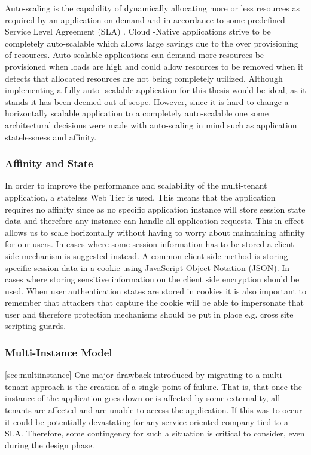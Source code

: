 Auto-scaling is the capability of dynamically allocating more or less resources as required by an application on demand and in accordance to some predefined Service Level Agreement (SLA) \cite{Swanson}. Cloud -Native applications strive to be completely auto-scalable which allows large savings due to the over provisioning of resources. Auto-scalable applications can demand more resources be provisioned when loads are high and could allow resources to be removed when it detects that allocated resources are not being completely utilized. Although implementing a fully auto -scalable application for this thesis would be ideal, as it stands it has been deemed out of scope. However, since it is hard to change a horizontally scalable application to a completely auto-scalable one some architectural decisions were made with auto-scaling in mind such as application statelessness and affinity.


\subsubsection{Affinity and State}

In order to improve the performance and scalability of the multi-tenant application, a stateless Web Tier is used. This means that the application requires no affinity since as no specific application instance will store session state data and therefore any instance can handle all application requests. This in effect allows us to scale horizontally without having to worry about maintaining affinity for our users. In cases where some session information has to be stored a client side mechanism is suggested instead. A common client side method is storing specific session data in a cookie using JavaScript Object Notation (JSON). In cases where storing sensitive information on the client side encryption should be used. When user authentication states are stored in cookies it is also important to remember that attackers that capture the cookie will be able to impersonate that user and therefore protection mechanisms should be put in place e.g. cross site scripting guards.


\subsubsection{Multi-Instance Model}
\ref{sec:multiinstance}
One major drawback introduced by migrating to a multi-tenant approach is the creation of a single point of failure. That is, that once the instance of the application goes down or is affected by some externality, all tenants are affected and are unable to access the application. If this was to occur it could be potentially devastating for any service oriented company tied to a SLA. Therefore, some contingency for such a situation is critical to consider, even during the design phase.
 
